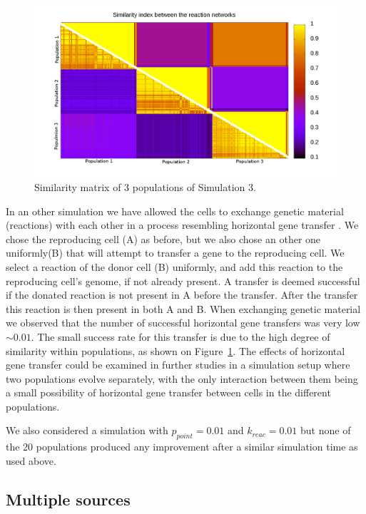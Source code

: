 \documentclass[a4paper,12pt]{article}
\begin{document}
\begin{figure}[htpb]
	\centering
	\includegraphics[width=1\linewidth]{simmatrix_sim3.png}
	\caption{Similarity matrix of 3 populations of Simulation 3.}
	\label{fig:simmatrix_sim3}
\end{figure}


In an other simulation we have allowed the cells to exchange genetic material (reactions) with each other in a process resembling horizontal gene transfer \cite{horizontalgenetransfer}. We chose the reproducing cell (A) as before, but we also chose an other one uniformly(B) that will attempt to transfer a gene to the reproducing cell. We select a reaction of the donor cell (B) uniformly, and add this reaction to the reproducing cell's genome, if not already present. A transfer is deemed successful if the donated reaction is not present in A before the transfer. After the transfer this reaction is then present in both A and B. When exchanging genetic material we observed that the number of successful horizontal gene transfers was very low $\sim 0.01$. The small success rate for this transfer is due to the high degree of similarity within populations, as shown on Figure~\ref{fig:simmatrix_sim3}. The effects of horizontal gene transfer could be examined in further studies in a simulation setup where two populations evolve separately, with the only interaction between them being a small possibility of horizontal gene transfer between cells in the different populations. %

We also considered a simulation with $p_{point}=0.01$ and $k_{reac}=0.01$ but none of the 20 populations produced any improvement after a similar simulation time as used above. 




\subsection{Multiple sources}
\label{sub:multiple_sources_and_sinks}
\end{document}
